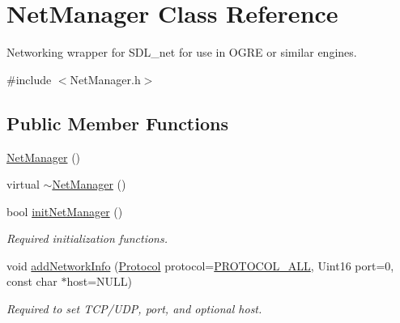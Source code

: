 \hypertarget{classNetManager}{\section{Net\-Manager Class Reference}
\label{classNetManager}
}


Networking wrapper for S\-D\-L\-\_\-net for use in O\-G\-R\-E or similar engines.  




{\ttfamily \#include $<$Net\-Manager.\-h$>$}

\subsection*{Public Member Functions}
\begin{DoxyCompactItemize}
\item 
\hyperlink{classNetManager_ac5af765a0303c73966c2e0743458f888}{Net\-Manager} ()
\item 
virtual \hyperlink{classNetManager_a862eebc070ee07d7a9e18f62da051604}{$\sim$\-Net\-Manager} ()
\end{DoxyCompactItemize}
{\bf }\par
\begin{DoxyCompactItemize}
\item 
bool \hyperlink{classNetManager_a9dcef281247169fc624d771f2a4ae01a}{init\-Net\-Manager} ()
\begin{DoxyCompactList}\small\item\em Required initialization functions. \end{DoxyCompactList}\item 
void \hyperlink{classNetManager_a8ec0340fa0eeffc5f4344589069e6058}{add\-Network\-Info} (\hyperlink{NetManager_8h_ac5a1bd9a1ae33c413bb774e1ac32501c}{Protocol} protocol=\hyperlink{NetManager_8h_a06fc87d81c62e9abb8790b6e5713c55ba78c8c360e9d58fb53829c58ac0ae6a43}{P\-R\-O\-T\-O\-C\-O\-L\-\_\-\-A\-L\-L}, Uint16 port=0, const char $\ast$host=N\-U\-L\-L)
\begin{DoxyCompactList}\small\item\em Required to set T\-C\-P/\-U\-D\-P, port, and optional host. \end{DoxyCompactList}\end{DoxyCompactItemize}

